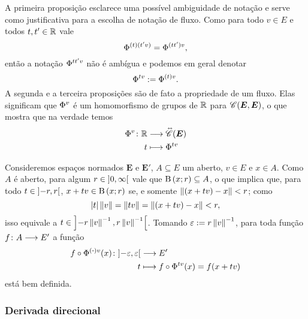 A primeira proposição esclarece uma possível ambiguidade de notação e serve como justificativa para a escolha de notação de fluxo. Como para todo $v \in E$ e todos $t,t' \in \mathbb{R}$ vale
	\begin{equation*}
	{\Phi}^{{(t)}{(t'v)}} = {\Phi}^{{(tt')}{v}},
	\end{equation*}
então a notação ${\Phi}^{{tt'}{v}}$ não é ambígua e podemos em geral denotar
	\begin{equation*}
	{\Phi}^{{t}{v}} := {\Phi}^{{(t)}{v}}.
	\end{equation*}
A segunda e a terceira proposições são de fato a propriedade de um fluxo. Elas significam que ${\Phi}^{{}{v}}$ é um homomorfismo de grupos de $\mathbb{R}$ para $\mathscr{C}(\bm E, \bm E)$, o que mostra que na verdade temos
	\begin{align*}
	{{\Phi}^{{}{v}}}\colon {\mathbb{R}} &\longrightarrow {\accentset{\leftrightarrow\ }{\mathscr{C}}(\bm E)} \\{t} &\longmapsto {\Phi}^{{t}{v}}
	\end{align*}

Consideremos espaços normados $\bm E$ e $\bm E'$, $A \subseteq E$ um aberto, $v \in E$ e $x \in A$. Como $A$ é aberto, para algum $r \in \left]0,\allowbreak \infty\right[$ vale que $\mathrm{B}\left(x; r\right) \subseteq A$, o que implica que, para todo $t \in \left]-r,\allowbreak r\right[$, $x + tv \in \mathrm{B}\left(x; r\right)$ se, e somente $\left\Vert{(x+tv)-x}\right\Vert<r$; como
	\begin{equation*}
	\left\vert{t}\right\vert\left\Vert{v}\right\Vert = \left\Vert{tv}\right\Vert = \left\Vert{(x+tv)-x}\right\Vert<r,
	\end{equation*}
isso equivale a $t \in \left]-r \left\Vert{v}\right\Vert^{-1},\allowbreak r \left\Vert{v}\right\Vert^{-1}\right[$. Tomando $\varepsilon := r \left\Vert{v}\right\Vert^{-1}$, para toda função $f\colon \allowbreak A \longrightarrow E'$ a função
	\begin{align*}
	{f \circ {\Phi}^{{(\bm{\cdot})}{v}}(x)}\colon {\left]-\varepsilon,\allowbreak \varepsilon\right[} &\longrightarrow {E'} \\{t} &\longmapsto f \circ {\Phi}^{{t}{v}}(x) = f(x+tv)
	\end{align*}
está bem definida.


\subsubsection{Derivada direcional}

